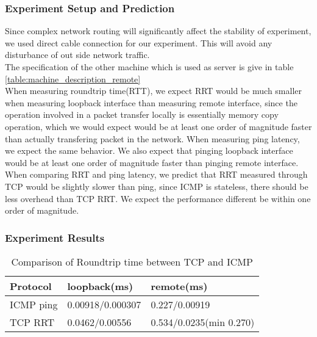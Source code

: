 \documentclass{article} %
\begin{document}
\subsubsection{Experiment Setup and Prediction}
Since complex network routing will significantly affect the stability of experiment, we used direct cable connection for our experiment. This will avoid any disturbance of out side network traffic. \\
The specification of the other machine which is used as server is give in table \ref{table:machine_description_remote}\\
When measuring roundtrip time(RTT), we expect RRT would be much smaller when measuring loopback interface than measuring remote interface, since the operation involved in a packet transfer locally is essentially memory copy operation, which we would expect would be at least one order of magnitude faster than actually transfering packet in the network. When measuring ping latency, we expect the same behavior. We also expect that pinging loopback interface would be at least one order of magnitude faster than pinging remote interface. \\
When comparing RRT and ping latency, we predict that RRT measured through TCP
would be slightly slower than ping, since ICMP is stateless, there should be
less overhead than TCP RRT\@. We expect the performance different be within one
order of magnitude.\\
\subsubsection{Experiment Results}

\begin{table}
  \begin{center}
    \caption{Comparison of Roundtrip time between TCP and ICMP}
    \begin{tabular}{|l|l|l|}
      \hline
      Protocol  & loopback(ms)     & remote(ms)              \\ \hline
      ICMP ping & 0.00918/0.000307 & 0.227/0.00919           \\ \hline
      TCP RRT   & 0.0462/0.00556   & 0.534/0.0235(min 0.270) \\ \hline
    \end{tabular}
    \label{table:roundtrip}
  \end{center}
\end{table}
\end{document}
